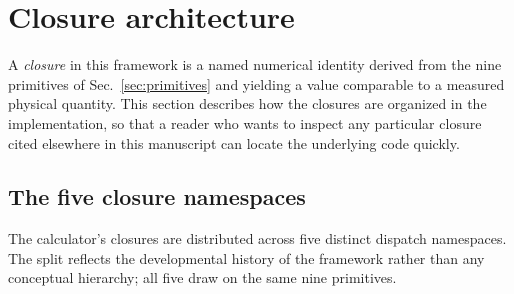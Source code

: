 
\section{Closure architecture}
\label{sec:architecture}

A \emph{closure} in this framework is a named numerical identity
derived from the nine primitives of Sec.~\ref{sec:primitives} and
yielding a value comparable to a measured physical quantity. This
section describes how the closures are organized in the
implementation, so that a reader who wants to inspect any
particular closure cited elsewhere in this manuscript can locate
the underlying code quickly.

\subsection{The five closure namespaces}
\label{sec:five_namespaces}

The calculator's closures are distributed across five
distinct dispatch namespaces. The split reflects the developmental
history of the framework rather than any conceptual hierarchy; all
five draw on the same nine primitives.

